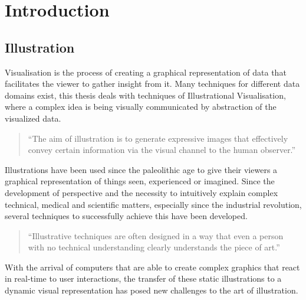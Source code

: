 \chapter{Introduction}
\section{Illustration}
Visualisation\cite{misc:BIGWebsite} is the process of creating a graphical representation of data that facilitates the viewer to gather insight from it. Many techniques for different data domains exist, this thesis deals with techniques of Illustrational Visualisation, where a complex idea is being visually communicated by abstraction of the visualized data.
\begin{quote}
``The aim of illustration is to generate expressive images that effectively convey certain information via the visual channel to the human observer.'' \cite{Viola:2005:SVV:2381219.2381249}
\end{quote}
Illustrations have been used since the paleolithic age\cite{Viola:2005:SVV:2381219.2381249} to give their viewers a graphical representation of things seen, experienced or imagined. Since the development of perspective and the necessity to intuitively explain complex technical, medical and scientific matters, especially since the industrial revolution, several techniques to successfully achieve this have been developed.
\begin{quote}
``Illustrative techniques are often designed in a way that even a person with no technical understanding clearly understands the piece of art.'' \cite{Viola:2005:SVV:2381219.2381249}
\end{quote}
With the arrival of computers that are able to create complex graphics that react in real-time to user interactions, the transfer of these static illustrations to a dynamic visual representation has posed new challenges to the art of illustration.\\

